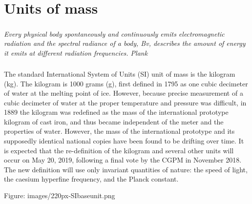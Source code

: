 \documentclass{book}
\begin{document}
	\chapter{Units of mass}
	
	\paragraph{}
	\begin{flushright}
		\emph{Every physical body spontaneously and continuously emits electromagnetic radiation and the spectral radiance of a body, Bv, describes the amount of energy it emits at different radiation frequencies. \textemdash Plank}
	\end{flushright}
	
	\paragraph{}
	The standard International System of Units (SI) unit of mass is the kilogram (kg). The kilogram is 1000 grams (g), first defined in 1795 as one cubic decimeter of water at the melting point of ice. However, because precise measurement of a cubic decimeter of water at the proper temperature and pressure was difficult, in 1889 the kilogram was redefined as the mass of the international prototype kilogram of cast iron, and thus became independent of the meter and the properties of water. However, the mass of the international prototype and its supposedly identical national copies have been found to be drifting over time. It is expected that the re-definition of the kilogram and several other units will occur on May 20, 2019, following a final vote by the CGPM in November 2018. The new definition will use only invariant quantities of nature: the speed of light, the caesium hyperfine frequency, and the Planck constant.
	
	Figure: images/220px-SIbaseunit.png
	
\end{document}
